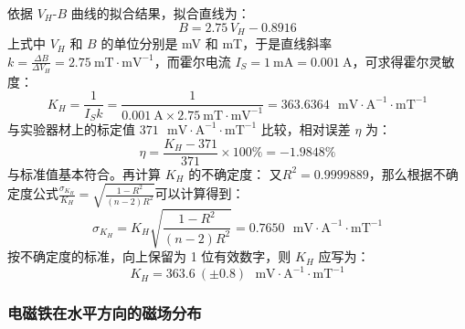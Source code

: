 \documentclass[UTF8]{article}
\theoremstyle{MyLineTheoremStyle} %
\theoremstyle{MyBlockTheoremStyle} %
\theoremstyle{MySubsubsectionStyle} %
\begin{document}
依据 $V_H$-$B$ 曲线的拟合结果，拟合直线为：
\begin{equation}
B = 2.75 \,V_H - 0.8916
\end{equation}
上式中 $V_H$ 和 $B$ 的单位分别是 mV 和 mT，于是直线斜率 $k = \frac{\Delta B}{\Delta V_H} = 2.75 \ \mathrm{mT\cdot mV^{-1}}$，而霍尔电流 $I_S = 1 \ \mathrm{mA} = 0.001 \ \mathrm{A}$，可求得霍尔灵敏度：
\begin{equation}
K_H = \frac{1}{I_S k} = \frac{1}{0.001 \ \mathrm{A} \times  2.75 \ \mathrm{mT\cdot mV^{-1}}} = 363.6364 \  \  \ \mathrm{mV}\cdot \mathrm{A^{-1}}\cdot \mathrm{mT}^{-1}
\end{equation}
与实验器材上的标定值 $371 \  \  \ \mathrm{mV}\cdot \mathrm{A^{-1}}\cdot \mathrm{mT}^{-1}$ 比较，相对误差 $\eta$ 为：
\begin{equation}
\eta = \frac{K_H - 371}{371} \times 100\% = - 1.9848 \%
\end{equation}
与标准值基本符合。再计算 $K_H$ 的不确定度：
又$ R^2=0.9999889 $，那么根据不确定度公式$ \frac{\sigma_{K_H}}{K_H}=\sqrt{\frac{1-R^2}{(n-2)R^2}} $可以计算得到：
\begin{equation}
\sigma_{K_H}=K_H\sqrt{\frac{1-R^2}{(n-2)R^2}}= 0.7650 \  \  \ \mathrm{mV}\cdot \mathrm{A^{-1}}\cdot \mathrm{mT}^{-1}
\end{equation}
按不确定度的标准，向上保留为 1 位有效数字，则 $K_H$ 应写为：
\begin{equation}
K_H = 363.6\  (\pm 0.8) \  \  \ \mathrm{mV}\cdot \mathrm{A^{-1}}\cdot \mathrm{mT}^{-1}
\end{equation}



\subsubsection{电磁铁在水平方向的磁场分布}
\end{document}
